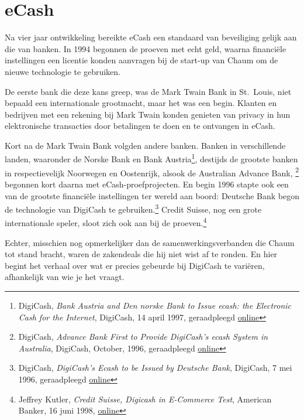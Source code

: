 \documentclass[
  a5paper,
  smalldemyvopaper,11pt,twoside,onecolumn,openright,extrafontsizes,
hidelinks]{memoir}
\begin{document}
\section{eCash}\label{ecash}

Na vier jaar ontwikkeling bereikte eCash een standaard van beveiliging
gelijk aan die van banken. In 1994 begonnen de proeven met echt geld,
waarna financiële instellingen een licentie konden aanvragen bij de
start-up van Chaum om de nieuwe technologie te gebruiken.

De eerste bank die deze kans greep, was de Mark Twain Bank in St.~Louis,
niet bepaald een internationale grootmacht, maar het was een begin.
Klanten en bedrijven met een rekening bij Mark Twain konden genieten van
privacy in hun elektronische transacties door betalingen te doen en te
ontvangen in eCash.

Kort na de Mark Twain Bank volgden andere banken. Banken in
verschillende landen, waaronder de Norske Bank en Bank
Austria\footnote{DigiCash, \emph{Bank Austria and Den norske Bank to
  Issue ecash: the Electronic Cash for the Internet}, DigiCash, 14 april
  1997, geraadpleegd
  \href{https://web.archive.org/web/19970605025912/http://www.digicash.com:80/publish/ec_pres8.html}{online}},
destijds de grootste banken in respectievelijk Noorwegen en Oostenrijk,
alsook de Australian Advance Bank, \footnote{DigiCash, \emph{Advance
  Bank First to Provide DigiCash's ecash System in Australia}, DigiCash,
  October, 1996, geraadpleegd
  \href{https://web.archive.org/web/19961102121407/https://www.digicash.com/publish/ec_pres6.html}{online}}
begonnen kort daarna met eCash-proefprojecten. En begin 1996 stapte ook
een van de grootste financiële instellingen ter wereld aan boord:
Deutsche Bank begon de technologie van DigiCash te gebruiken.\footnote{DigiCash,
  \emph{DigiCash's Ecash to be Issued by Deutsche Bank}, DigiCash, 7 mei
  1996, geraadpleegd
  \href{https://web.archive.org/web/19961102121355/https://www.digicash.com/publish/ec_pres5.html}{online}}
Credit Suisse, nog een grote internationale speler, sloot zich ook aan
bij de proeven.\footnote{Jeffrey Kutler, \emph{Credit Suisse, Digicash
  in E-Commerce Test}, American Banker, 16 juni 1998,
  \href{https://www.americanbanker.com/news/credit-suisse-digicash-in-e-commerce-test}{online}}

Echter, misschien nog opmerkelijker dan de samenwerkingsverbanden die
Chaum tot stand bracht, waren de zakendeals die hij niet wist af te
ronden. En hier begint het verhaal over wat er precies gebeurde bij
DigiCash te variëren, afhankelijk van wie je het vraagt.
\end{document}
